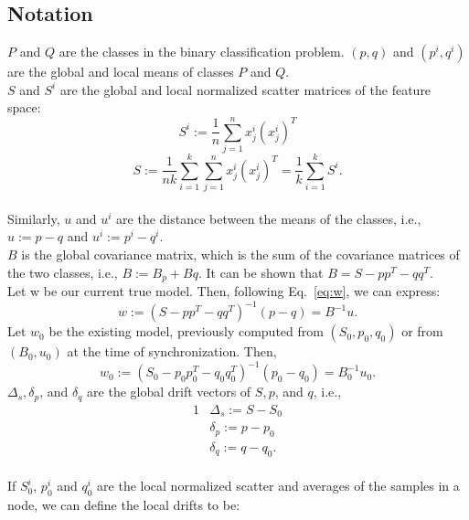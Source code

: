 \subsection{Notation}
\noindent
$P$ and $Q$ are the classes in the binary classification problem.
 $(p,q)$ and $(p^i,q^i)$  are the global and local means of classes $P$ and $Q$.
\\$S$ and $S^i$  are the global and local normalized scatter matrices of the feature space:
\begin{equation*}
S^i := \frac{1}{n}\sum_{j=1}^{n}x^i_j(x^i_j)^T
\end{equation*}
\begin{equation*}
S := \frac{1}{nk}
\sum_{i=1}^k\sum_{j=1}^nx^i_j(x^i_j)^T=\frac{1}{k}\sum_{i=1}^kS^i.
\end{equation*}
\\Similarly, $u$ and $u^i$ are the distance between the means of the classes, i.e., $u:=p - q$ and $u^i:=p^i - q^i$.
\\ $B$ is the global covariance matrix, which is the sum of the covariance matrices of the two classes, i.e., $B:=B_p+Bq$.
It can be shown that $B=S - pp^T - qq^T$.
\\Let w be our current true model. Then, following Eq.~\ref{eq:w}, we can express:
\begin{equation}
w:=(S - pp^T - qq^T)^{-1}(p-q)=B^{-1}u.
\end{equation}
Let $w_0$ be the existing model, previously computed from $(S_0, p_0, q_0)$
or from $(B_0,u_0)$ at the time of synchronization.
Then,
\begin{equation}
w_0:=(S_0 - p_0p_0^T - q_0q_0^T)^{-1}(p_0-q_0)=B_0^{-1}u_0.
\end{equation}
$\Delta_s, \delta_p$, and $\delta_q$ are the global drift vectors of $S, p$, and $q$,
i.e.,
\begin{alignat*}{1}
& \Delta_s:= S - S_0 \\
& \delta_p:= p - p_0 \\
& \delta_q := q - q_0.
\end{alignat*}
\\If $S_0^i$, $p_0^i$ and $q_0^i$ are the local normalized scatter and averages
of the samples in a node, we can define the local drifts to be:
